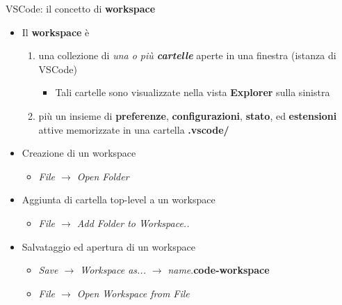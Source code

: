 \documentclass[xcolor=dvipsnames,presentation]{beamer}
\begin{document}
\begin{frame}{VSCode: il concetto di \textbf{workspace}}

\begin{itemize}
\item Il \textbf{workspace} è 
	\begin{enumerate}
	\item una collezione di \emph{una o più \textbf{cartelle}} aperte in una finestra (istanza di VSCode)
	\begin{itemize}
	\item Tali cartelle sono visualizzate nella vista \textbf{Explorer} sulla sinistra
	\end{itemize}
	\item più un insieme di \textbf{preferenze}, \textbf{configurazioni}, \textbf{stato}, ed \textbf{estensioni} attive memorizzate in una cartella \textbf{.vscode/}
	\end{enumerate}
\item Creazione di un workspace
	\begin{itemize}
	\item \emph{File $\to$ Open Folder}
	\end{itemize}
\item Aggiunta di cartella top-level a un workspace
	\begin{itemize}
	\item \emph{File $\to$ Add Folder to Workspace..}
	\end{itemize}
\item Salvataggio ed apertura di un workspace
	\begin{itemize}
	\item \emph{Save $\to$ Workspace as... $\to$} \emph{name}.\textbf{code-workspace} 
	\item \emph{File $\to$ Open Workspace from File}
	\end{itemize}
\end{itemize}

\end{frame}
	
\end{document}
